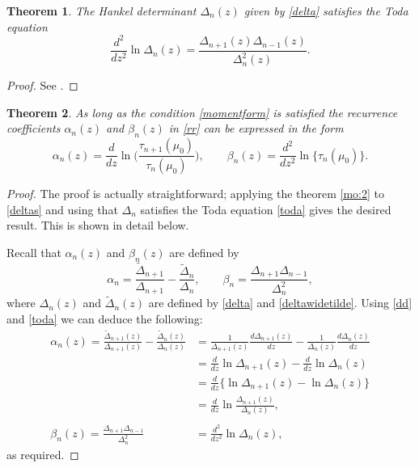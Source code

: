 \documentclass[12pt]{article}
\newtheorem{mydef}{Theorem}[section]
\numberwithin{figure}{section}
\numberwithin{equation}{section}
\numberwithin{table}{section}
\begin{document}
\begin{mydef}
The Hankel determinant $\Delta_n(z)$ given by \eqref{delta} satisfies the Toda equation
\begin{equation}\label{toda}
\frac{d^2}{dz^2}\ln\Delta_n(z)=\frac{\Delta_{n+1}(z)\Delta_{n-1}(z)}{\Delta_n^2(z)}.
\end{equation}
\end{mydef}
\begin{proof}
See \cite{P:30:54,P:151:528,P:62:1887}.
\end{proof}
\begin{mydef}
As long as the condition \eqref{momentform} is satisfied the recurrence coefficients $\alpha_n(z)$ and $\beta_n(z)$ in \eqref{rr} can be expressed in the form
\begin{equation}
\alpha_n(z)=\frac{d}{dz}\ln\bigg(\frac{\tau_{n+1}(\mu_0)}{\tau_{n}(\mu_0)}\bigg),\qquad \beta_n(z)=\frac{d^2}{dz^2}\!\ln\{\tau_{n}(\mu_0)\}.\label{deltas2}
\end{equation}
\end{mydef}
\begin{proof}
The proof is actually straightforward; applying the theorem \ref{mo:2} to \eqref{deltas} and using that $\Delta_n$ satisfies the Toda equation \eqref{toda} gives the desired result. This is shown in detail below.

Recall that $\alpha_n(z)$ and $\beta_n(z)$ are defined by
\begin{equation}\nonumber
\alpha_n=\frac{\widetilde\Delta_{n+1}}{\Delta_{n+1}}-\frac{\widetilde\Delta_{n}}{\Delta_{n}},\qquad
\beta_n=\frac{\Delta_{n+1}\Delta_{n-1}}{\Delta_n^2},
\end{equation}
where $\Delta_n(z)$ and $\widetilde\Delta_n(z)$ are defined by \eqref{delta} and \eqref{deltawidetilde}. Using \eqref{dd} and \eqref{toda} we can deduce the following:
\begin{align*}
\alpha_n(z)=\frac{\widetilde\Delta_{n+1}(z)}{\Delta_{n+1}(z)}-\frac{\widetilde\Delta_n(z)}{\Delta_n(z)}
&=\frac{1}{\Delta_{n+1}(z)}\frac{d\Delta_{n+1}(z)}{dz}-\frac{1}{\Delta_{n}(z)}\frac{d\Delta_{n}(z)}{dz}\\
&=\frac{d}{dz}\ln \Delta_{n+1}(z)-\frac{d}{dz}\ln \Delta_{n}(z)\\
&=\frac{d}{dz}\bigg\{\ln\Delta_{n+1}(z)-\ln\Delta_{n}(z)\bigg\}\\
&=\frac{d}{dz}\ln\frac{\Delta_{n+1}(z)}{\Delta_{n}(z)},\\
\nonumber\\
\beta_n(z)=\frac{\Delta_{n+1}\Delta_{n-1}}{\Delta_n^2}
&=\frac{d^2}{dz^2}\ln\Delta_n(z),
\end{align*}
as required.
\end{proof}
\end{document}
